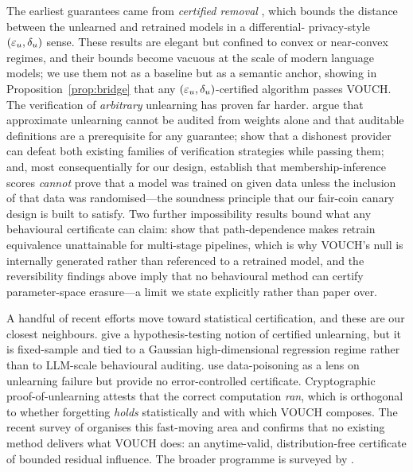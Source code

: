 The earliest guarantees came from \emph{certified removal}
\citep{guo2020certified,sekhari2021remember,neel2021descent,ginart2019making}, which
bounds the distance between the unlearned and retrained models in a differential-
privacy-style $(\varepsilon_u,\delta_u)$ sense. These results are elegant but confined to
convex or near-convex regimes, and their bounds become vacuous at the scale of modern
language models; we use them not as a baseline but as a semantic anchor, showing in
Proposition~\ref{prop:bridge} that any $(\varepsilon_u,\delta_u)$-certified algorithm passes
VOUCH. The verification of \emph{arbitrary} unlearning has proven far harder.
\citet{thudi2022necessity} argue that approximate unlearning cannot be audited from
weights alone and that auditable definitions are a prerequisite for any guarantee;
\citet{zhang2024verification} show that a dishonest provider can defeat both existing
families of verification strategies while passing them; and, most consequentially for
our design, \citet{zhang2024mia} establish that membership-inference scores
\emph{cannot} prove that a model was trained on given data unless the inclusion of
that data was randomised---the soundness principle that our fair-coin canary design
is built to satisfy. Two further impossibility results bound what any behavioural
certificate can claim: \citet{yu2025impossibility} show that path-dependence makes
retrain equivalence unattainable for multi-stage pipelines, which is why VOUCH's null
is internally generated rather than referenced to a retrained model, and the
reversibility findings above imply that no behavioural method can certify
parameter-space erasure---a limit we state explicitly rather than paper over.

A handful of recent efforts move toward statistical certification, and these are our
closest neighbours. \citet{pandey2025gaussian} give a hypothesis-testing notion of
certified unlearning, but it is fixed-sample and tied to a Gaussian high-dimensional
regression regime rather than to LLM-scale behavioural auditing.
\citet{pawelczyk2025machine} use data-poisoning as a lens on unlearning failure but
provide no error-controlled certificate. Cryptographic proof-of-unlearning
\citep{eisenhofer2025verifiable} attests that the correct computation \emph{ran},
which is orthogonal to whether forgetting \emph{holds} statistically and with which
VOUCH composes. The recent survey of \citet{xue2026survey} organises this fast-moving
area and confirms that no existing method delivers what VOUCH does: an anytime-valid,
distribution-free certificate of bounded residual influence. The broader
programme is surveyed by \citet{liu2025rethinking}.

